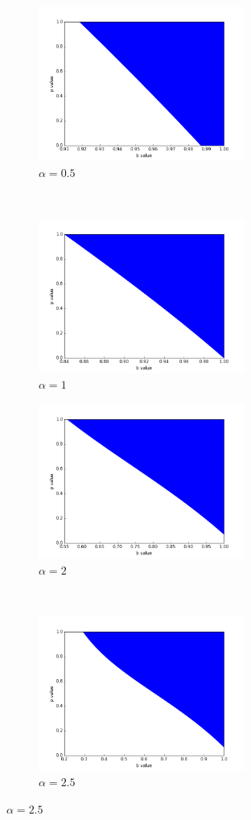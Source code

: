 \begin{figure}[t!]
\centering
\begin{subfigure}[t]{0.5\textwidth}
\centering
\includegraphics[height=2in]{./figures/bp_pair_rorAB_al0p5_dense.png}
\caption{$\alpha = 0.5$}
\end{subfigure}%
~ 
\begin{subfigure}[t]{0.5\textwidth}
\centering
\includegraphics[height=2in]{./figures/bp_pair_rorAB_al1p0_dense.png}
\caption{$\alpha = 1$}
\end{subfigure}
\centering
\begin{subfigure}[t]{0.5\textwidth}
\centering
\includegraphics[height=2in]{./figures/bp_pair_rorAB_al2p0_dense.png}
\caption{$\alpha = 2$}
\end{subfigure}%
~ 
\begin{subfigure}[t]{0.5\textwidth}
\centering
\includegraphics[height=2in]{./figures/bp_pair_rorAB_al2p5_dense.png}
\caption{$\alpha = 2.5$}
\end{subfigure}


\end{figure}
